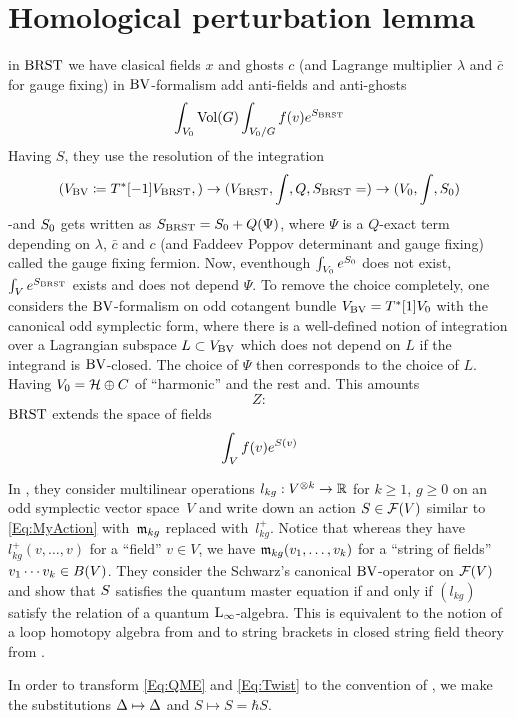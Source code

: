 \documentclass[\MainFolder/Text.tex]{subfiles}
\begin{document}
\section{Homological perturbation lemma}


\begin{Remark}
in $\mathrm{BRST}$ we have clasical fields $x$ and ghosts $c$ (and Lagrange multiplier $\lambda$ and $\bar{c}$ for gauge fixing)
in $\mathrm{BV}$-formalism add anti-fields and anti-ghosts
$$ \int_{V_0} \mathrm{Vol}(G) \int_{V_0/G} f(v) e^{S_{\mathrm{BRST}}}$$
Having $S$, they use the 
resolution of the integration
$$(V_{\mathrm{BV}}\coloneqq T^*[-1]V_{\mathrm{BRST}},) \rightarrow (V_{\mathrm{BRST}},\int,Q,S_{\mathrm{BRST}} =)\rightarrow (V_0,\int,S_0)$$
-and $S_0$ gets written as $S_{\mathrm{BRST}} = S_0 +  Q(\Psi)$, where $\Psi$ is a $Q$-exact term depending on $\lambda$, $\bar{c}$ and $c$ (and Faddeev Poppov determinant and gauge fixing) called the gauge fixing fermion. Now, eventhough $\int_{V_0} e^{S_0}$ does not exist, $\int_V e^{S_{\mathrm{BRST}}}$ exists and does not depend $\Psi$. To remove the choice completely, one considers the $\mathrm{BV}$-formalism on odd cotangent bundle $V_{\mathrm{BV}} = T^*[1] V_{0}$ with the canonical odd symplectic form, where there is a well-defined notion of integration over a Lagrangian subspace $L \subset V_{\mathrm{BV}}$ which does not depend on $L$ if  the integrand is $\mathrm{BV}$-closed. The choice of $\Psi$ then corresponds to the choice of $L$. Having $V_0 = \mathcal{H} \oplus C$ of ``harmonic'' and the rest and. This amounts 
$$ Z:  $$
$\mathrm{BRST}$ extends the space of fields 
$$ $$
$$ \int_V f(v) e^{S(v)} $$
\end{Remark}


In \cite{Doubek2018}, they consider multilinear operations $l_{kg}: V^{\otimes k} \rightarrow \mathbb{R}$ for $k\ge 1$, $g\ge 0$ on an odd symplectic vector space~$V$ and write down an action $S\in \mathcal{F}(V)$ similar to \eqref{Eq:MyAction} with~$\mathfrak{m}_{kg}$ replaced with~$l_{kg}^+$. Notice that whereas they have $l^+_{kg}(v,\dotsc,v)$ for a ``field'' $v\in V$, we have $\mathfrak{m}_{kg}(v_1,\dotsc,v_k)$ for a ``string of fields'' $v_1\dotsb v_k\in B(V)$. They consider the Schwarz's canonical $\mathrm{BV}$-operator on $\mathcal{F}(V)$ and show that $S$ satisfies the quantum master equation if and only if $(l_{kg})$ satisfy the relation of a quantum $\mathrm{L}_\infty$-algebra. This is equivalent to the notion of a loop homotopy algebra from \cite{Markl1997} and to string brackets in closed string field theory from \cite{Zwiebach1992}.

In order to transform \eqref{Eq:QME} and \eqref{Eq:Twist} to the convention of \cite{Doubek2018}, we make the substitutions $\operatorname{\Delta} \mapsto \operatorname{\Delta}$ and $S \mapsto S = \hbar S$.
\end{document}
